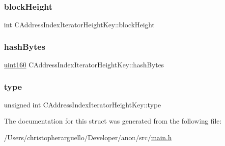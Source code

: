 \subsubsection{\texorpdfstring{block\+Height}{blockHeight}}
{\footnotesize\ttfamily int C\+Address\+Index\+Iterator\+Height\+Key\+::block\+Height}

\mbox{\label{struct_c_address_index_iterator_height_key_a581fde27d32792608fbda14ed1c7285a}} 
\subsubsection{\texorpdfstring{hash\+Bytes}{hashBytes}}
{\footnotesize\ttfamily \mbox{\hyperlink{classuint160}{uint160}} C\+Address\+Index\+Iterator\+Height\+Key\+::hash\+Bytes}

\mbox{\label{struct_c_address_index_iterator_height_key_a3aeef3918aebc23da830715dc3b4a247}} 
\subsubsection{\texorpdfstring{type}{type}}
{\footnotesize\ttfamily unsigned int C\+Address\+Index\+Iterator\+Height\+Key\+::type}



The documentation for this struct was generated from the following file\+:\begin{DoxyCompactItemize}
\item 
/\+Users/christopherarguello/\+Developer/anon/src/\mbox{\hyperlink{main_8h}{main.\+h}}\end{DoxyCompactItemize}

